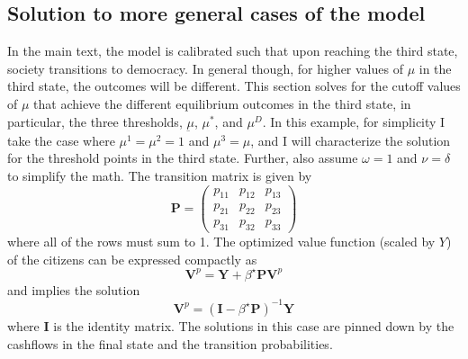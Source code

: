 \subsection{Solution to more general cases of the model}\label{section:generalCase}

In the main text, the model is calibrated such that upon reaching the third state, society transitions to democracy. In general though, for higher values of $\mu$ in the third state, the outcomes will be different. This section solves for the cutoff values of $\mu$ that achieve the different equilibrium outcomes in the third state, in particular, the three thresholds, $\underbar{\ensuremath{\mu}}$, $\mu^{*}$, and $\mu^{D}$. In this example, for simplicity I take the case where $\mu^1 = \mu^2 = 1$ and $\mu^3 = \mu$, and I will characterize the solution for the threshold points in the third state. Further, also assume $\omega=1$ and $\nu=\delta$ to simplify the math. The transition matrix is given by
\begin{equation*}
\mathbf{P}=\begin{pmatrix}
p_{11} & p_{12} & p_{13} \\
p_{21} & p_{22} & p_{23} \\
p_{31} & p_{32} & p_{33} 
\end{pmatrix}
\end{equation*}
where all of the rows must sum to 1. The optimized value function (scaled by $Y$) of the citizens can be expressed compactly as
\begin{equation*}
\mathbf{V}^p = \mathbf{Y} + \beta^\star \mathbf{P}\mathbf{V}^p
\end{equation*}
and implies the solution
\begin{equation}
\mathbf{V}^p =(\mathbf{I}-\beta^\star \mathbf{P})^{-1} \mathbf{Y}
\end{equation}
where $\mathbf{I}$ is the identity matrix. The solutions in this case are pinned down by the cashflows in the final state and the transition probabilities.

